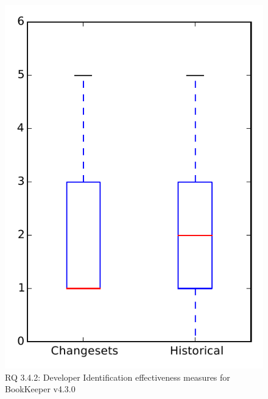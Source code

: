 
\begin{figure}
\centering
\includegraphics[height=0.4\textheight]{figures/dit/rq2_bookkeeper}
\caption{RQ 3.4.2: Developer Identification effectiveness measures for BookKeeper v4.3.0}
\label{fig:dit:rq2:bookkeeper}
\end{figure}
